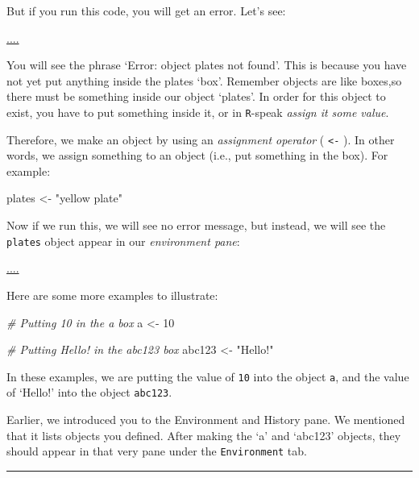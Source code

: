 \documentclass[
]{book}
\newenvironment{Shaded}{\begin{snugshade}}{\end{snugshade}}
\newcommand{\CommentTok}[1]{\textcolor[rgb]{0.56,0.35,0.01}{\textit{#1}}}
\newcommand{\DecValTok}[1]{\textcolor[rgb]{0.00,0.00,0.81}{#1}}
\newcommand{\NormalTok}[1]{#1}
\newcommand{\OtherTok}[1]{\textcolor[rgb]{0.56,0.35,0.01}{#1}}
\newcommand{\StringTok}[1]{\textcolor[rgb]{0.31,0.60,0.02}{#1}}
\begin{document}
But if you run this code, you will get an error. Let's see:

\url{....}

You will see the phrase `Error: object plates not found'. This is because you have not yet put anything inside the plates `box'. Remember objects are like boxes,so there must be something inside our object `plates'. In order for this object to exist, you have to put something inside it, or in \texttt{R}-speak \emph{assign it some value}.

Therefore, we make an object by using an \emph{assignment operator} ( \texttt{\textless{}-} ). In other words, we assign something to an object (i.e., put something in the box). For example:

\begin{Shaded}
\begin{Highlighting}[]
\NormalTok{plates }\OtherTok{\textless{}{-}} \StringTok{"yellow plate"}
\end{Highlighting}
\end{Shaded}

Now if we run this, we will see no error message, but instead, we will see the \texttt{plates} object appear in our \emph{environment pane}:

\url{....}

Here are some more examples to illustrate:

\begin{Shaded}
\begin{Highlighting}[]
\CommentTok{\# Putting \textquotesingle{}10\textquotesingle{} in the \textquotesingle{}a\textquotesingle{} box}
\NormalTok{a }\OtherTok{\textless{}{-}} \DecValTok{10}

\CommentTok{\# Putting \textquotesingle{}Hello!\textquotesingle{} in the \textquotesingle{}abc123\textquotesingle{} box}
\NormalTok{abc123 }\OtherTok{\textless{}{-}} \StringTok{"Hello!"}
\end{Highlighting}
\end{Shaded}

In these examples, we are putting the value of \texttt{10} into the object \texttt{a}, and the value of `Hello!' into the object \texttt{abc123}.

Earlier, we introduced you to the Environment and History pane. We mentioned that it lists objects you defined. After making the `a' and `abc123' objects, they should appear in that very pane under the \texttt{Environment} tab.

\begin{center}\rule{0.5\linewidth}{0.5pt}\end{center}
\end{document}

